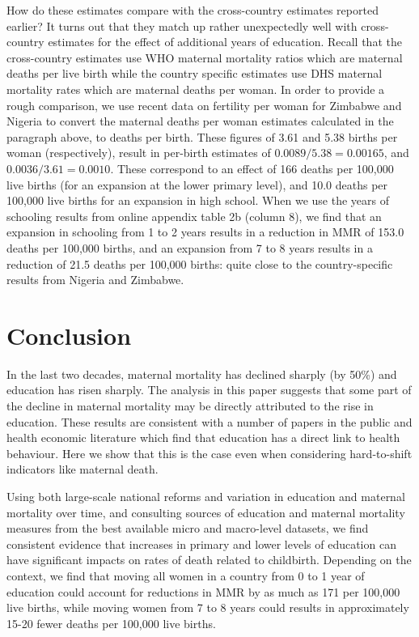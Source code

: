 \documentclass{article}[12pt,subeqn]
\begin{document}
\begin{spacing}{1.4}
How do these estimates compare with the cross-country estimates reported earlier? 
It turns out that they match up rather unexpectedly well with cross-country 
estimates for the effect of additional years of education. Recall that the 
cross-country estimates use WHO maternal mortality ratios which are maternal 
deaths per live birth while the country specific estimates use DHS maternal 
mortality rates which are maternal deaths per woman.  In order to provide a rough 
comparison, we use recent data \citep{CIA2012} on fertility per woman for Zimbabwe 
and Nigeria to convert the maternal deaths per woman estimates calculated in the 
paragraph above, to deaths per birth.  These figures of 3.61 and 5.38 births per 
woman (respectively), result in per-birth estimates of $0.0089/5.38=0.00165$, and 
$0.0036/3.61=0.0010$.  These correspond to an effect of 166 deaths per 100,000 
live births (for an expansion at the lower primary level), and 10.0 deaths per 
100,000 live births for an expansion in high school. When we use the years of 
schooling results from online appendix table 2b (column 8), we find that an 
expansion in schooling from 1 to 2 years results in a reduction in MMR of 153.0 
deaths per 100,000 births, and an expansion from 7 to 8 years results in a 
reduction of 21.5 deaths per 100,000 births: quite close to the country-specific 
results from Nigeria and Zimbabwe.

\section{Conclusion}
In the last two decades, maternal mortality has declined sharply (by 50\%) and 
education has risen sharply. The analysis in this paper suggests that some part 
of the decline in maternal mortality may be directly attributed to the rise in
education.  These results are consistent with a number of papers in the public
and health economic literature which find that education has a direct link to
health behaviour. Here we show that this is the case even when considering
hard-to-shift indicators like maternal death.

Using both large-scale national reforms and variation in education and maternal
mortality over time, and consulting sources of education and maternal mortality
measures from the best available micro and macro-level datasets, we find
consistent evidence that increases in primary and lower levels of education can
have significant impacts on rates of death related to childbirth.  Depending on
the context, we find that moving all women in a country from 0 to 1 year of
education could account for reductions in MMR by as much as 171 per 100,000
live births, while moving women from 7 to 8 years could results in approximately
15-20 fewer deaths per 100,000 live births.


\end{spacing}
\end{document}
